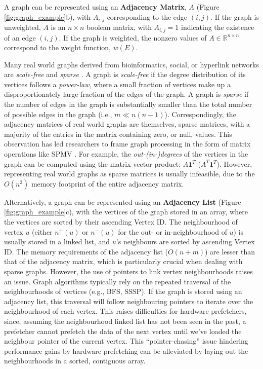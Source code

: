 A graph can be represented using an \textbf{Adjacency Matrix}, $A$ (Figure \ref{fig:graph_example}b), with $A_{i,j}$ corresponding to the edge $(i, j)$. If the graph is unweighted, $A$ is an $n\times n$ boolean matrix, with $A_{i,j} = 1$ indicating the existence of an edge $(i, j)$.
If the graph is weighted, the nonzero values of $A\in\mathbb{R}^{n\times n}$ correspond to the weight function, $w(E)$.

Many real world graphs derived from bioinformatics, social, or hyperlink networks are
\textit{scale-free} \cite{sapco} and \textit{sparse} \cite{danisch2018listing}.
A graph is \textit{scale-free} if the degree distribution of its vertices follows a \textit{power-law}, where a small fraction of vertices make up a disproportionately large fraction of the edges of the graph.
A graph is \textit{sparse} if the number of edges in the graph is substantially smaller than the total number of possible edges in the graph (i.e., $m \ll n(n-1)$). 
Correspondingly, the adjacency matrices of real world graphs are themselves, sparse matrices, with a majority of the entries in the matrix containing zero, or null, values. This observation has led researchers to frame graph processing in the form of matrix operations like \ac{SPMV} \cite{graphmat}. For example, the \textit{out-(in-)degrees} of the vertices in the graph can be computed using the matrix-vector product: $A\mathbf{1}^T$ ($A^T\mathbf{1}^T$). However, representing real world graphs as sparse matrices is usually infeasible, due to the $O(n^2)$ memory footprint of the entire adjacency matrix.

Alternatively, a graph can be represented using an \textbf{Adjacency List} (Figure \ref{fig:graph_example}c), with the vertices of the graph stored in an array, where the vertices are sorted by their ascending Vertex ID. The neighbourhood of vertex $u$ (either $n^{+}(u)$ or $n^{-}(u)$ for the out- or in-neighbourhood of $u$) is usually stored in a linked list, and $u$'s neighbours are sorted by ascending Vertex ID. The memory requirements of the adjacency list ($O(n + m)$) are lesser than that of the adjacency matrix, which is particularly crucial when dealing with sparse graphs. However, the use of pointers to link vertex neighbourhoods raises an issue.
Graph algorithms typically rely on the repeated traversal of the neighbourhoods of vertices (e.g., \ac{BFS}, \ac{SSSP}). If the graph is stored using an adjacency list, this traversal will follow neighbouring pointers to iterate over the neighbourhood of each vertex. This raises difficulties for hardware prefetchers, since, assuming the neighbourhood linked list has not been seen in the past, a prefetcher cannot prefetch the data of the next vertex until we've loaded the neighbour pointer of the current vertex. This ``pointer-chasing'' issue hindering performance gains by hardware prefetching can be alleviated by laying out the neighbourhoods in a sorted, contiguous array.

